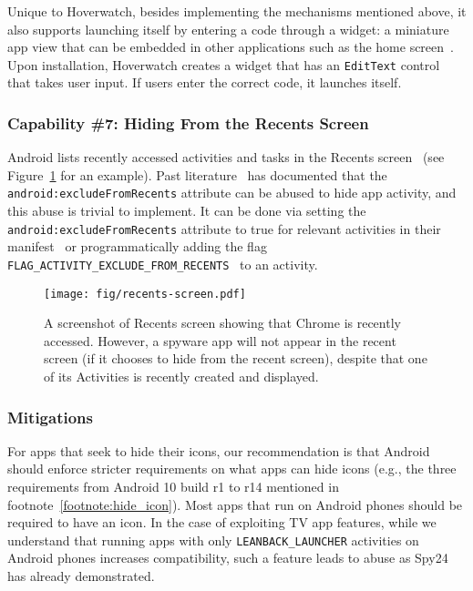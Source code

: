 Unique to Hoverwatch, besides implementing the mechanisms mentioned above, it also supports launching itself by entering a
code through a widget: a miniature app view that can be embedded in other
applications such as the home screen~\cite{Appwidge49:online}. Upon installation,
Hoverwatch creates a widget that has an \texttt{EditText} control that takes user input. If users
enter the correct code, it launches itself.



\subsubsection*{Capability \#7: Hiding From the Recents Screen}

Android lists recently accessed activities and tasks in the Recents
screen~\cite{Recentss9:online} (see Figure~\ref{fig:recents_screen} for an
example). Past literature~\cite{shan2018self, zhou2020demystifying} has
documented that the \texttt{android:excludeFromRecents} attribute can be abused
to hide app activity, and this abuse is trivial to implement. It can be done via
setting the \texttt{android:excludeFromRecents} attribute to true for relevant
activities in their manifest~\cite{activity72:online} or programmatically adding
the flag
\texttt{FLAG\_ACTIVITY\_EXCLUDE\_FROM\_RECENTS}~\cite{IntentAn90:online} to an
activity.

\begin{figure}[t]
\centering
\texttt{[image: fig/recents-screen.pdf]}
\caption[Recent Apps Screen Example]{A screenshot of Recents screen showing that Chrome is recently accessed. However, a spyware app will not appear in the recent screen (if it chooses to hide from the recent screen), despite that one of its Activities is recently created and displayed.}
\label{fig:recents_screen}
\end{figure}


\subsubsection{Mitigations}
For apps that seek to hide their icons, our recommendation is that Android should enforce stricter requirements on what apps can hide icons (e.g., the three requirements from Android 10 build r1 to r14 mentioned in footnote~\ref{footnote:hide_icon}).
Most apps that run on Android phones should be required to have an icon. In the case of exploiting TV app features, while we
understand that running apps with only \texttt{LEANBACK\_LAUNCHER} activities on
Android phones increases compatibility, such a feature leads to abuse as Spy24
has already demonstrated.

